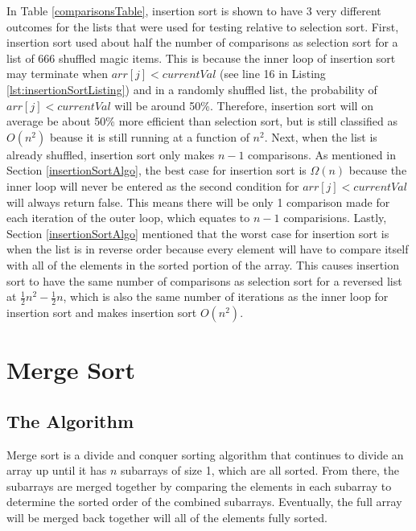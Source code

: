 \documentclass[letterpaper, 10pt,DIV=13]{scrartcl}
\numberwithin{equation}{section} %
\numberwithin{figure}{section} %
\numberwithin{table}{section} %
\begin{document}
In Table \ref{comparisonsTable}, insertion sort is shown to have 3 very different outcomes for the lists that were used for testing relative to selection sort. First, insertion sort used about half the number of comparisons as selection sort for a list of 666 shuffled magic items. This is because the inner loop of insertion sort may terminate when $arr[j] < currentVal$ (see line 16 in Listing \ref{lst:insertionSortListing}) and in a randomly shuffled list, the probability of $arr[j] < currentVal$ will be around 50\%. Therefore, insertion sort will on average be about 50\% more efficient than selection sort, but is still classified as $O(n^2)$ beause it is still running at a function of $n^2$. Next, when the list is already shuffled, insertion sort only makes $n-1$ comparisons. As mentioned in Section \ref{insertionSortAlgo}, the best case for insertion sort is $\Omega(n)$ because the inner loop will never be entered as the second condition for $arr[j] < currentVal$ will always return false. This means there will be only 1 comparison made for each iteration of the outer loop, which equates to $n - 1$ comparisions. Lastly, Section \ref{insertionSortAlgo} mentioned that the worst case for insertion sort is when the list is in reverse order because every element will have to compare itself with all of the elements in the sorted portion of the array. This causes insertion sort to have the same number of comparisons as selection sort for a reversed list at $\frac{1}{2}n^2 - \frac{1}{2}n$, which is also the same number of iterations as the inner loop for insertion sort and makes insertion sort $O(n^2)$.

\section{Merge Sort}
\subsection{The Algorithm}
Merge sort is a divide and conquer sorting algorithm that continues to divide an array up until it has $n$ subarrays of size 1, which are all sorted. From there, the subarrays are merged together by comparing the elements in each subarray to determine the sorted order of the combined subarrays. Eventually, the full array will be merged back together will all of the elements fully sorted.
\end{document}

